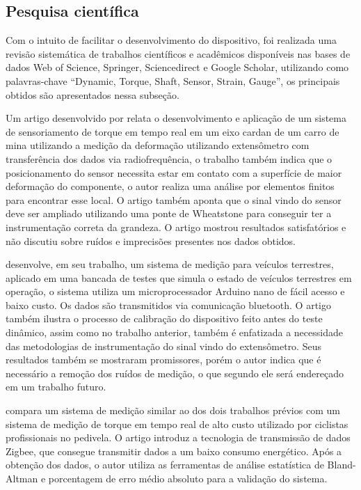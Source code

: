 \subsection{Pesquisa científica}

Com o intuito de facilitar o desenvolvimento do dispositivo, foi realizada uma revisão sistemática de trabalhos científicos e acadêmicos disponíveis nas bases de dados Web of Science, Springer,
Sciencedirect e Google Scholar, utilizando como palavras-chave “Dynamic, Torque, Shaft, Sensor, Strain, Gauge”, os principais obtidos são apresentados nessa subseção.

Um artigo desenvolvido por \autocite{Niedworok2014} relata o desenvolvimento e aplicação de um sistema de sensoriamento de torque em tempo real em um eixo cardan de um carro de mina utilizando a medição
da deformação utilizando extensômetro com transferência dos dados via radiofrequência, o trabalho também indica que o posicionamento do sensor necessita estar em contato com a superfície de maior deformação do componente,
o autor realiza uma análise por elementos finitos para encontrar esse local. O artigo também aponta que o sinal vindo do sensor deve ser ampliado utilizando uma ponte de Wheatstone para conseguir ter a instrumentação
correta da grandeza. O artigo mostrou resultados satisfatórios e não discutiu sobre ruídos e imprecisões presentes nos dados obtidos.

\autocite{Nurprasetio2018} desenvolve, em seu trabalho, um sistema de medição para veículos terrestres, aplicado em uma bancada de testes que simula o estado de veículos terrestres em operação, o sistema
utiliza um microprocessador Arduino nano de fácil acesso e baixo custo. Os dados são transmitidos via comunicação bluetooth. O artigo também ilustra o processo de calibração do dispositivo feito antes do teste dinâmico,
assim como no trabalho anterior, também é enfatizada a necessidade das metodologias de instrumentação do sinal vindo do extensômetro. Seus resultados também se mostraram promissores, porém o autor indica que é necessário
a remoção dos ruídos de medição, o que segundo ele será endereçado em um trabalho futuro.

\autocite{Gharghan2017} compara um sistema de medição similar ao dos dois trabalhos prévios com um sistema de medição de torque em tempo real de alto custo utilizado por ciclistas profissionais no pedivela.
O artigo introduz a tecnologia de transmissão de dados Zigbee, que consegue transmitir dados a um baixo consumo energético. Após a obtenção dos dados, o autor utiliza as ferramentas de análise estatística de Bland-Altman
e porcentagem de erro médio absoluto para a validação do sistema.

